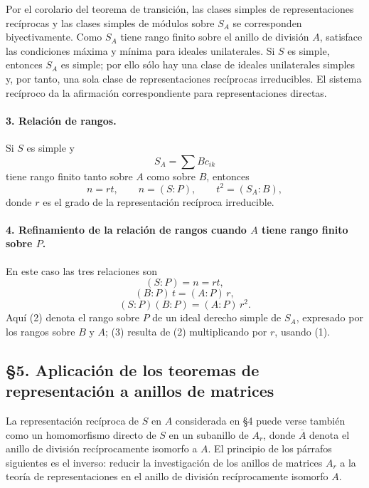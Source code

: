 Por el corolario del teorema de transición, las clases simples de representaciones recíprocas y las clases simples de módulos sobre \(S_A\) se corresponden biyectivamente. Como \(S_A\) tiene rango finito sobre el anillo de división \(A\), satisface las condiciones máxima y mínima para ideales unilaterales. Si \(S\) es simple, entonces \(S_A\) es simple; por ello sólo hay una clase de ideales unilaterales simples y, por tanto, una sola clase de representaciones recíprocas irreducibles. El sistema recíproco da la afirmación correspondiente para representaciones directas.

\paragraph{3. Relación de rangos.}
Si \(S\) es simple y
\[
        S_A=\sum Bc_{ik}
\]
tiene rango finito tanto sobre \(A\) como sobre \(B\), entonces
\[
        n=rt,
        \qquad n=(S:P),
        \qquad t^2=(S_A:B),                                             \tag{1}
\]
donde \(r\) es el grado de la representación recíproca irreducible.

\paragraph{4. Refinamiento de la relación de rangos cuando \(A\) tiene rango finito sobre \(P\).}
En este caso las tres relaciones son
\[
        (S:P)=n=rt,                                                     \tag{1}
\]
\[
        (B:P)\,t=(A:P)\,r,                                               \tag{2}
\]
\[
        (S:P)(B:P)=(A:P)\,r^2.                                           \tag{3}
\]
Aquí (2) denota el rango sobre \(P\) de un ideal derecho simple de \(S_A\), expresado por los rangos sobre \(B\) y \(A\); (3) resulta de (2) multiplicando por \(r\), usando (1).

\subsection*{§5. Aplicación de los teoremas de representación a anillos de matrices}

La representación recíproca de \(S\) en \(A\) considerada en §4 puede verse también como un homomorfismo directo de \(S\) en un subanillo de \(A_r\), donde \(\overline A\) denota el anillo de división recíprocamente isomorfo a \(A\). El principio de los párrafos siguientes es el inverso: reducir la investigación de los anillos de matrices \(A_r\) a la teoría de representaciones en el anillo de división recíprocamente isomorfo \(A\).

